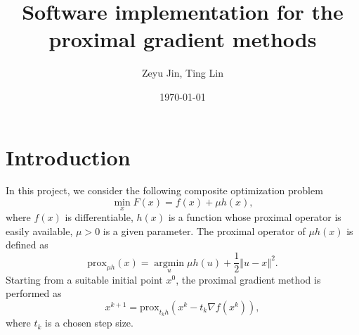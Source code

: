 \documentclass[a4paper]{article}
\title{Software implementation for the proximal gradient methods}
\author{Zeyu Jin, Ting Lin}
\date{\today}
\newcommand{\norm}[1]{\left\Vert#1\right\Vert}
\newcommand{\prox}{\mathrm{prox}}
\begin{document}
  \maketitle
  \tableofcontents
  
  \section{Introduction}
  \label{sec:intro}
  In this project, we consider the following composite optimization 
  problem
  \begin{equation}
    \min\limits_{x} F(x) = f(x) + \mu h(x),
  \end{equation}
  where $f(x)$ is differentiable, $h(x)$ is a function whose 
  proximal operator is easily available, $\mu > 0$ is a given 
  parameter.
  The proximal operator of $\mu h(x)$ is defined as
  \begin{displaymath}
    \prox_{\mu h}(x) = \mathop{\arg\min}\limits_{u} \mu h(u) + 
    \frac{1}{2} \norm{u - x}^2.
  \end{displaymath}
  Starting from a suitable initial point $x^0$, the proximal gradient 
  method is performed as
  \begin{equation}\label{equ:pg}
    x^{k+1} = \prox_{t_k h} (x^k - t_k \nabla f(x^k)),
  \end{equation}
  where $t_k$ is a chosen step size.
  
\end{document}
